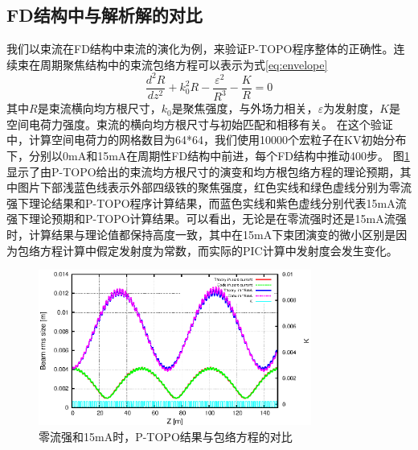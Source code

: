 \subsection{FD结构中与解析解的对比}
我们以束流在FD结构中束流的演化为例，来验证P-TOPO程序整体的正确性。连续束在周期聚焦结构中的束流包络方程可以表示为式\ref{eq:envelope}\cite{wangler1998particle,chen1994nonlinear}
\begin{equation}\label{eq:envelope}
  \frac{{{d}^{2}}R}{d{{z}^{2}}}+k_{0}^{2}R-\frac{{{\varepsilon }^{2}}}{{{R}^{3}}}-\frac{K}{R}=0
\end{equation}
其中$R$是束流横向均方根尺寸，$k_0$是聚焦强度，与外场力相关，$\varepsilon$为发射度，$K$是空间电荷力强度。束流的横向均方根尺寸与初始匹配和相移有关。
在这个验证中，计算空间电荷力的网格数目为64*64，我们使用10000个宏粒子在KV初始分布下，分别以0mA和15mA在周期性FD结构中前进，每个FD结构中推动400步。
图\ref{fig:P_TOPO_verification2}显示了由P-TOPO给出的束流均方根尺寸的演变和均方根包络方程的理论预期，其中图片下部浅蓝色线表示外部四级铁的聚焦强度，红色实线和绿色虚线分别为零流强下理论结果和P-TOPO程序计算结果，而蓝色实线和紫色虚线分别代表15mA流强下理论预期和P-TOPO计算结果。可以看出，无论是在零流强时还是15mA流强时，计算结果与理论值都保持高度一致，其中在15mA下束团演变的微小区别是因为包络方程计算中假定发射度为常数，而实际的PIC计算中发射度会发生变化。

\begin{figure}[!htb]
    \centering
    \includegraphics[width=0.8\textwidth]{Img/P_TOPO_verification2.eps}
    \caption{零流强和15mA时，P-TOPO结果与包络方程的对比}
    \label{fig:P_TOPO_verification2}
\end{figure}



